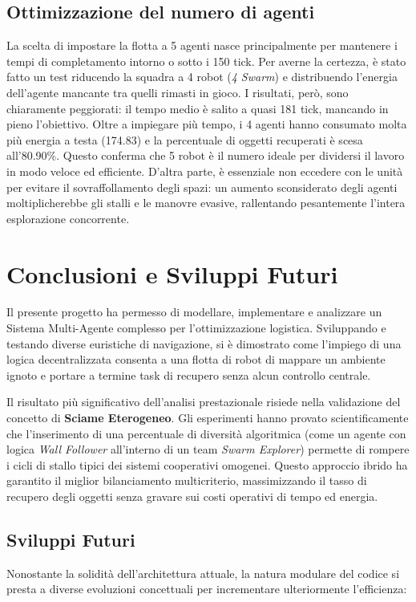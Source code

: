 \documentclass[11pt,a4paper]{article}
\begin{document}
\subsection{Ottimizzazione del numero di agenti}
La scelta di impostare la flotta a 5 agenti nasce principalmente per mantenere i tempi di completamento intorno o sotto i 150 tick. Per averne la certezza, è stato fatto un test riducendo la squadra a 4 robot (\textit{4 Swarm}) e distribuendo l'energia dell'agente mancante tra quelli rimasti in gioco. I risultati, però, sono chiaramente peggiorati: il tempo medio è salito a quasi 181 tick, mancando in pieno l'obiettivo. Oltre a impiegare più tempo, i 4 agenti hanno consumato molta più energia a testa (174.83) e la percentuale di oggetti recuperati è scesa all'80.90\%. Questo conferma che 5 robot è il numero ideale per dividersi il lavoro in modo veloce ed efficiente. D'altra parte, è essenziale non eccedere con le unità per evitare il sovraffollamento degli spazi: un aumento sconsiderato degli agenti moltiplicherebbe gli stalli e le manovre evasive, rallentando pesantemente l'intera esplorazione concorrente.

\section{Conclusioni e Sviluppi Futuri}

Il presente progetto ha permesso di modellare, implementare e analizzare un Sistema Multi-Agente complesso per l'ottimizzazione logistica. Sviluppando e testando diverse euristiche di navigazione, si è dimostrato come l'impiego di una logica decentralizzata consenta a una flotta di robot di mappare un ambiente ignoto e portare a termine task di recupero senza alcun controllo centrale. 

Il risultato più significativo dell'analisi prestazionale risiede nella validazione del concetto di \textbf{Sciame Eterogeneo}. Gli esperimenti hanno provato scientificamente che l'inserimento di una percentuale di diversità algoritmica (come un agente con logica \textit{Wall Follower} all'interno di un team \textit{Swarm Explorer}) permette di rompere i cicli di stallo tipici dei sistemi cooperativi omogenei. Questo approccio ibrido ha garantito il miglior bilanciamento multicriterio, massimizzando il tasso di recupero degli oggetti senza gravare sui costi operativi di tempo ed energia.

\subsection{Sviluppi Futuri}
Nonostante la solidità dell'architettura attuale, la natura modulare del codice si presta a diverse evoluzioni concettuali per incrementare ulteriormente l'efficienza:
\end{document}
